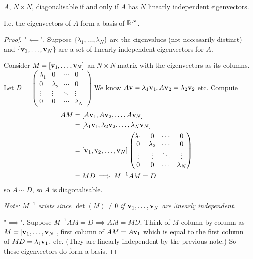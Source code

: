 \documentclass[10pt, a4paper]{article}
\begin{document}
\begin{proposition}
    $A$,
    $N \times N$,
    diagonalisable if and only if $A$ has $N$ linearly independent eigenvectors.
    
    I.e. the eigenvectors of $A$ form a basis of $\mathbb{R} ^ N$.
    \begin{proof}
        "$\impliedby$".
        Suppose $\{\lambda_1, \dotsc, \lambda_N\}$ are the eigenvalues
        (not necessarily distinct)
        and $\{\mathbf{v}_1, \dotsc, \mathbf{v}_N\}$ are a set of linearly independent eigenvectors for $A$.

        Consider $M = [\mathbf{v}_1, \dotsc, \mathbf{v}_N]$ an $N \times N$ matrix with the eigenvectors as its columns.
        Let $D = \begin{pmatrix}
            \lambda_1 & 0 & \dotsi & 0 \\
            0 & \lambda_2 & \dotsi & 0 \\
            \vdots & \vdots & \ddots & \vdots \\
            0 & 0 & \dotsi & \lambda_N
        \end{pmatrix}$
        We know $A\mathbf{v} = \lambda_1\mathbf{v}_1, A\mathbf{v}_2 = \lambda_2\mathbf{v}_2$ etc.
        Compute
        \begin{align*}
            AM &= [A\mathbf{v}_1, A\mathbf{v}_2, \dotsc, A\mathbf{v}_N] \\
            &= [\lambda_1\mathbf{v}_1, \lambda_2\mathbf{v}_2, \dotsc, \lambda_N\mathbf{v}_N] \\
            &= [\mathbf{v}_1, \mathbf{v}_2, \dotsc, \mathbf{v}_N]\begin{pmatrix}
                \lambda_1 & 0 & \dotsi & 0 \\
                0 & \lambda_2 & \dotsi & 0 \\
                \vdots & \vdots & \ddots & \vdots \\
                0 & 0 & \dotsi & \lambda_N
            \end{pmatrix} \\
            &= MD \implies M ^ {-1}AM = D
        \end{align*}
        so $A \sim D$,
        so $A$ is diagonalisable.
        
        \textit{Note:
        $M ^ {-1}$ exists since $\det(M) \neq 0$ if $\mathbf{v}_1, \dotsc, \mathbf{v}_N$ are linearly independent.}

        "$\implies$".
        Suppose $M ^ {-1}AM = D \implies AM = MD$.
        Think of $M$ column by column as $M = [\mathbf{v}_1, \dotsc, \mathbf{v}_N]$,
        first column of $AM = A\mathbf{v}_1$ which is equal to the first column of $MD = \lambda_1\mathbf{v}_1$,
        etc.
        (They are linearly independent by the previous note.)
        So these eigenvectors do form a basis.
    \end{proof}
\end{proposition}
\end{document}
